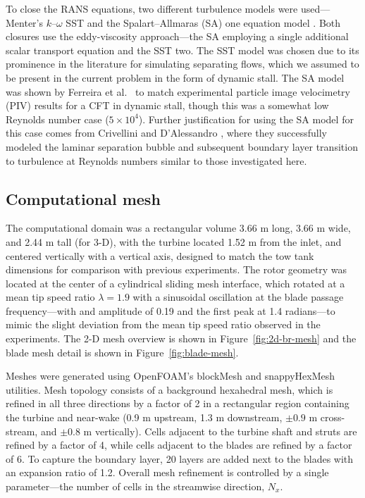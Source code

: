 To close the RANS equations, two different turbulence models were
used---Menter's $k$--$\omega$ SST \cite{Menter1994} and the Spalart--Allmaras
(SA) one equation model \cite{Spalart1992}. Both closures use the eddy-viscosity
approach---the SA employing a single additional scalar transport equation and
the SST two. The SST model was chosen due to its prominence in the literature
for simulating separating flows, which we assumed to be present in the current
problem in the form of dynamic stall. The SA model was shown by Ferreira
et al.~\cite{Ferreira2007} to match experimental particle image
velocimetry (PIV) results for a CFT in dynamic stall, though this was a somewhat
low Reynolds number case ($5 \times 10^4$). Further justification for using the
SA model for this case comes from Crivellini and D'Alessandro
\cite{Crivellini2014}, where they successfully modeled the laminar separation
bubble and subsequent boundary layer transition to turbulence at Reynolds
numbers similar to those investigated here.



\subsection{Computational mesh}

The computational domain was a rectangular volume 3.66 m long, 3.66 m wide, and
2.44 m tall (for 3-D), with the turbine located 1.52 m from the inlet, and
centered vertically with a vertical axis, designed to match the tow tank
dimensions for comparison with previous experiments. The rotor geometry was
located at the center of a cylindrical sliding mesh interface, which rotated at
a mean tip speed ratio $\lambda=1.9$ with a sinusoidal oscillation at the blade
passage frequency---with and amplitude of 0.19 and the first peak at 1.4
radians---to mimic the slight deviation from the mean tip speed ratio observed
in the experiments. The 2-D mesh overview is shown in
Figure~\ref{fig:2d-br-mesh} and the blade mesh detail is shown in
Figure~\ref{fig:blade-mesh}.

Meshes were generated using OpenFOAM's blockMesh and snappyHexMesh utilities.
Mesh topology consists of a background hexahedral mesh, which is refined in all
three directions by a factor of 2 in a rectangular region containing the turbine
and near-wake (0.9 m upstream, 1.3 m downstream, $\pm 0.9$ m cross-stream, and
$\pm 0.8$ m vertically). Cells adjacent to the turbine shaft and struts are
refined by a factor of 4, while cells adjacent to the blades are refined by a
factor of 6. To capture the boundary layer, 20 layers are added next to the
blades with an expansion ratio of 1.2. Overall mesh refinement is controlled by
a single parameter---the number of cells in the streamwise direction, $N_x$.


